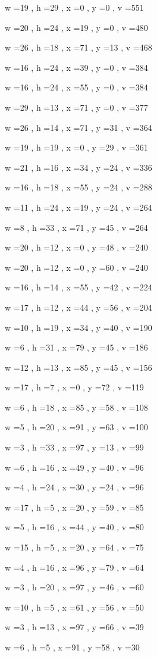 \documentclass[11pt]{article}
\begin{document}
w =19 , h =29 , x =0 , y =0 , v =551
\par
w =20 , h =24 , x =19 , y =0 , v =480
\par
w =26 , h =18 , x =71 , y =13 , v =468
\par
w =16 , h =24 , x =39 , y =0 , v =384
\par
w =16 , h =24 , x =55 , y =0 , v =384
\par
w =29 , h =13 , x =71 , y =0 , v =377
\par
w =26 , h =14 , x =71 , y =31 , v =364
\par
w =19 , h =19 , x =0 , y =29 , v =361
\par
w =21 , h =16 , x =34 , y =24 , v =336
\par
w =16 , h =18 , x =55 , y =24 , v =288
\par
w =11 , h =24 , x =19 , y =24 , v =264
\par
w =8 , h =33 , x =71 , y =45 , v =264
\par
w =20 , h =12 , x =0 , y =48 , v =240
\par
w =20 , h =12 , x =0 , y =60 , v =240
\par
w =16 , h =14 , x =55 , y =42 , v =224
\par
w =17 , h =12 , x =44 , y =56 , v =204
\par
w =10 , h =19 , x =34 , y =40 , v =190
\par
w =6 , h =31 , x =79 , y =45 , v =186
\par
w =12 , h =13 , x =85 , y =45 , v =156
\par
w =17 , h =7 , x =0 , y =72 , v =119
\par
w =6 , h =18 , x =85 , y =58 , v =108
\par
w =5 , h =20 , x =91 , y =63 , v =100
\par
w =3 , h =33 , x =97 , y =13 , v =99
\par
w =6 , h =16 , x =49 , y =40 , v =96
\par
w =4 , h =24 , x =30 , y =24 , v =96
\par
w =17 , h =5 , x =20 , y =59 , v =85
\par
w =5 , h =16 , x =44 , y =40 , v =80
\par
w =15 , h =5 , x =20 , y =64 , v =75
\par
w =4 , h =16 , x =96 , y =79 , v =64
\par
w =3 , h =20 , x =97 , y =46 , v =60
\par
w =10 , h =5 , x =61 , y =56 , v =50
\par
w =3 , h =13 , x =97 , y =66 , v =39
\par
w =6 , h =5 , x =91 , y =58 , v =30
\par
\newpage
\end{document}
